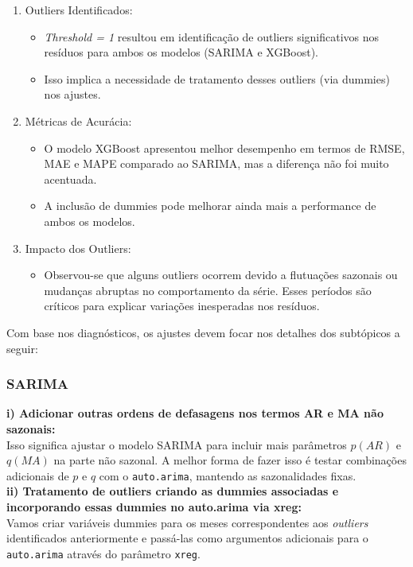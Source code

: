 \documentclass[a4paper, 12pt]{article}
\begin{document}
\begin{enumerate}
    \item Outliers Identificados:
    \begin{itemize}
        \item \textit{Threshold = 1} resultou em identificação de outliers significativos nos resíduos para ambos os modelos (SARIMA e XGBoost).
        \item Isso implica a necessidade de tratamento desses outliers (via dummies) nos ajustes.
    \end{itemize}
    \item Métricas de Acurácia:
    \begin{itemize}
        \item O modelo XGBoost apresentou melhor desempenho em termos de RMSE, MAE e MAPE comparado ao SARIMA, mas a diferença não foi muito acentuada.
        \item A inclusão de dummies pode melhorar ainda mais a performance de ambos os modelos.
    \end{itemize}
    \item Impacto dos Outliers:
    \begin{itemize}
        \item Observou-se que alguns outliers ocorrem devido a flutuações sazonais ou mudanças abruptas no comportamento da série. Esses períodos são críticos para explicar variações inesperadas nos resíduos.
    \end{itemize}
\end{enumerate}


Com base nos diagnósticos, os ajustes devem focar nos detalhes dos subtópicos a seguir:

\subsubsection{SARIMA}

\textbf{i)  Adicionar outras ordens de defasagens nos termos AR e MA não sazonais:}\\
Isso significa ajustar o modelo SARIMA para incluir mais parâmetros $p (AR)$ e $q (MA)$ na parte não sazonal. A melhor forma de fazer isso é testar combinações adicionais de $p$ e $q$ com o \texttt{auto.arima}, mantendo as sazonalidades fixas.\\

\textbf{ii)  Tratamento de outliers criando as dummies associadas e incorporando essas dummies no auto.arima via xreg:}\\
Vamos criar variáveis dummies para os meses correspondentes aos \textit{outliers} identificados anteriormente e passá-las como argumentos adicionais para o \texttt{auto.arima} através do parâmetro \texttt{xreg}.\\
\end{document}
